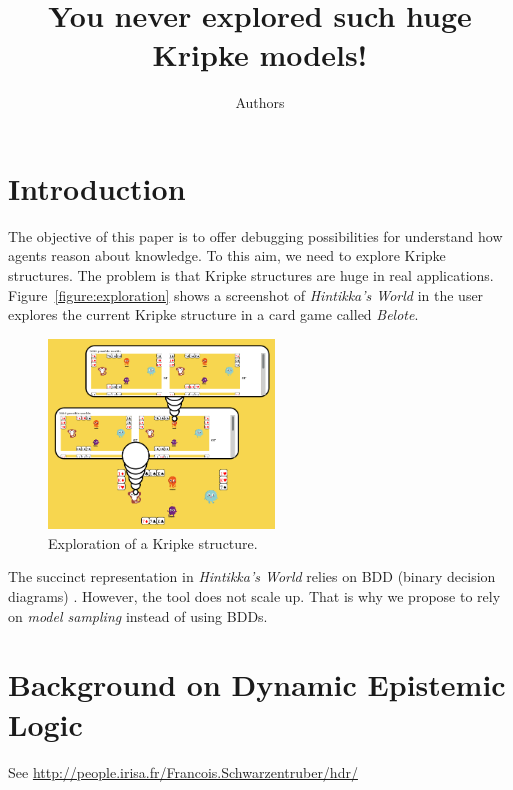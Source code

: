 \documentclass{article}
\begin{document}
\title{You never explored such huge Kripke models!}
\author{Authors}

\maketitle


\section{Introduction}

The objective of this paper is to offer debugging possibilities for understand how agents reason about knowledge. To this aim, we need to explore Kripke structures. The problem is that Kripke structures are huge in real applications. Figure~\ref{figure:exploration} shows a screenshot of \emph{Hintikka's World} in the user explores the current Kripke structure in a card game called \emph{Belote}.

\begin{figure}
	\begin{center}
		\includegraphics[width=6cm]{images/hintikkasworld_exploration.png}
	\end{center}
	\caption{Exploration of a Kripke structure.}
\end{figure}

The succinct representation in \emph{Hintikka's World} relies on BDD (binary decision diagrams) \cite{DBLP:conf/ijcai/CharrierGNS19}. However, the tool does not scale up. That is why we propose to rely on \emph{model sampling}  \cite{DBLP:conf/lpar/SharmaGRM18} instead of using BDDs.


\section{Background on Dynamic Epistemic Logic}

See \url{http://people.irisa.fr/Francois.Schwarzentruber/hdr/}
\end{document}
